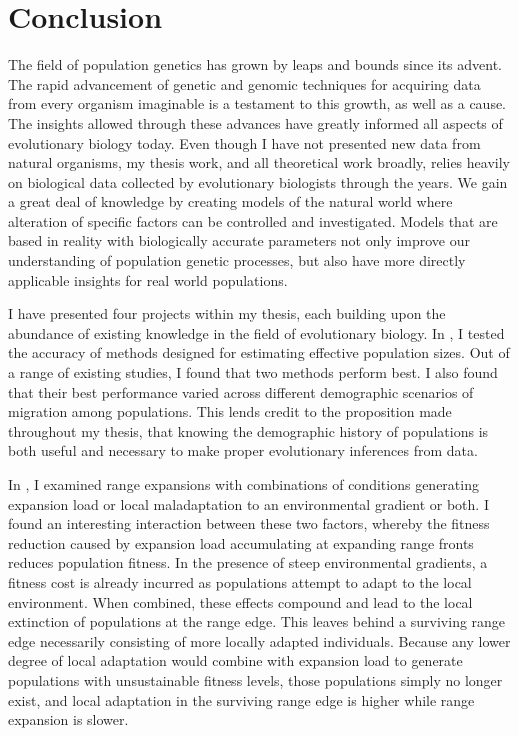\chapter{Conclusion}
\label{chap:conclusions}

The field of population genetics has grown by leaps and bounds since its advent. The rapid advancement of genetic and genomic techniques for acquiring data from every organism imaginable is a testament to this growth, as well as a cause. The insights allowed through these advances have greatly informed all aspects of evolutionary biology today. Even though I have not presented new data from natural organisms, my thesis work, and all theoretical work broadly, relies heavily on biological data collected by evolutionary biologists through the years. We gain a great deal of knowledge by creating models of the natural world where alteration of specific factors can be controlled and investigated. Models that are based in reality with biologically accurate parameters not only improve our understanding of population genetic processes, but also have more directly applicable insights for real world populations.

I have presented four projects within my thesis, each building upon the abundance of existing knowledge in the field of evolutionary biology. In , I tested the accuracy of methods designed for estimating effective population sizes. Out of a range of existing studies, I found that two methods perform best. I also found that their best performance varied across different demographic scenarios of migration among populations. This lends credit to the proposition made throughout my thesis, that knowing the demographic history of populations is both useful and necessary to make proper evolutionary inferences from data.

In , I examined range expansions with combinations of conditions generating expansion load or local maladaptation to an environmental gradient or both. I found an interesting interaction between these two factors, whereby the fitness reduction caused by expansion load accumulating at expanding range fronts reduces population fitness. In the presence of steep environmental gradients, a fitness cost is already incurred as populations attempt to adapt to the local environment. When combined, these effects compound and lead to the local extinction of populations at the range edge. This leaves behind a surviving range edge necessarily consisting of more locally adapted individuals. Because any lower degree of local adaptation would combine with expansion load to generate populations with unsustainable fitness levels, those populations simply no longer exist, and local adaptation in the surviving range edge is higher while range expansion is slower. 

